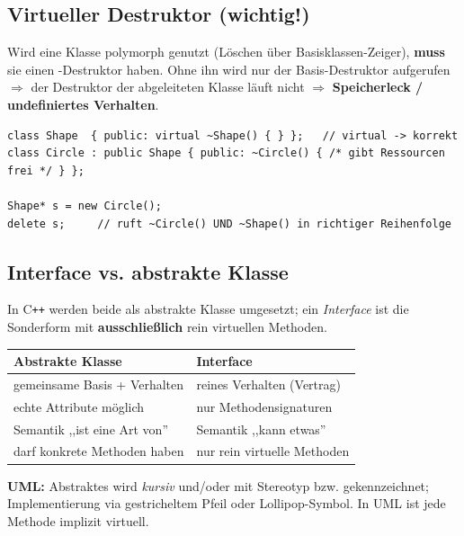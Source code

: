 \subsection{Virtueller Destruktor (wichtig!)}
\begin{merke}
Wird eine Klasse polymorph genutzt (L\"oschen \"uber Basisklassen-Zeiger), \textbf{muss} sie einen -Destruktor haben. Ohne ihn wird nur der Basis-Destruktor aufgerufen $\Rightarrow$ der Destruktor der abgeleiteten Klasse l\"auft nicht $\Rightarrow$ \textbf{Speicherleck / undefiniertes Verhalten}.
\end{merke}
\begin{lstlisting}
class Shape  { public: virtual ~Shape() { } };   // virtual -> korrekt
class Circle : public Shape { public: ~Circle() { /* gibt Ressourcen frei */ } };

Shape* s = new Circle();
delete s;     // ruft ~Circle() UND ~Shape() in richtiger Reihenfolge
\end{lstlisting}

\subsection{Interface vs. abstrakte Klasse}
In C\texttt{++} werden beide als abstrakte Klasse umgesetzt; ein \emph{Interface} ist die Sonderform mit \textbf{ausschlie\ss lich} rein virtuellen Methoden.
\begin{center}\small
\begin{tabular}{@{}ll@{}}
\toprule
\textbf{Abstrakte Klasse} & \textbf{Interface} \\
\midrule
gemeinsame Basis + Verhalten & reines Verhalten (Vertrag) \\
echte Attribute m\"oglich & nur Methodensignaturen \\
Semantik ,,ist eine Art von'' & Semantik ,,kann etwas'' \\
darf konkrete Methoden haben & nur rein virtuelle Methoden \\
\bottomrule
\end{tabular}
\end{center}
\textbf{UML:} Abstraktes wird \emph{kursiv} und/oder mit Stereotyp  bzw.  gekennzeichnet; Implementierung via gestricheltem Pfeil oder Lollipop-Symbol. In UML ist jede Methode implizit virtuell.
\clearpage
